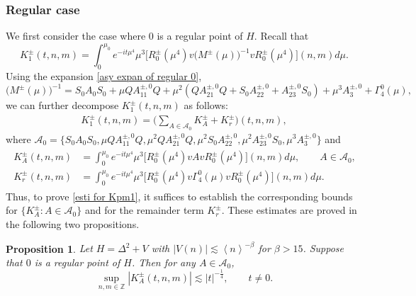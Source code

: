 \documentclass[reqno, 11pt]{amsart}
\newtheorem{proposition}[definition]{Proposition}
\newcommand\Z{\mathbb{Z}}
\newcommand\mcaA{\mathcal{A}}
\numberwithin{equation}{section}
\begin{document}
\subsubsection{{\bf {Regular case}}}
We first consider the case where $0$ is a regular point of $H$. Recall that
\begin{equation}\label{kernel of Kpm1}
K^{\pm}_{1}(t,n,m)=\int_{0}^{\mu_0}e^{-it\mu^4}\mu^3\big[R^{\pm}_0(\mu^4)v\big(M^{\pm}(\mu)\big)^{-1}vR^{\pm}_0(\mu^4)\big](n,m)d\mu.
\end{equation}
Using the expansion \eqref{asy expan of regular 0},
\begin{equation*}
\big(M^{\pm}(\mu)\big)^{-1}=S_0A_{0}S_0+\mu QA^{\pm,0}_{11}Q+\mu^2(QA^{\pm,0}_{21}Q+S_0A^{\pm,0}_{22}+A^{\pm,0}_{23}S_0)+\mu^3A^{\pm,0}_3+\Gamma^{0}_{4}(\mu),
\end{equation*}
we can further decompose $K^{\pm}_{1}(t,n,m)$ as follows:
\begin{align}\label{new expr of K1 regular 0}
K^{\pm}_1(t,n,m)=\Big(\sum\limits_{A\in\mcaA_0}K^{\pm}_A+K^{\pm}_r\Big)(t,n,m),
\end{align}
where $\mcaA_0=\{S_0A_{0}S_0,\mu QA^{\pm,0}_{11}Q,\mu^2QA^{\pm,0}_{21}Q,\mu^2S_0A^{\pm,0}_{22},\mu^2A^{\pm,0}_{23}S_0,\mu^3A^{\pm,0}_3\}$ and
\begin{align}\label{set A0 and kernel in regular case}
\begin{split}
K^{\pm}_A(t,n,m)&=\int_{0}^{\mu_0}e^{-it\mu^4}\mu^3\big[R^{\pm}_0(\mu^4)vAvR^{\pm}_0(\mu^4)\big](n,m)d\mu,\qquad A\in\mcaA_0,\\
K^{\pm}_r(t,n,m)&=\int_{0}^{\mu_0}e^{-it\mu^4}\mu^3\big[R^{\pm}_0(\mu^4)v\Gamma^0_{4}(\mu)vR^{\pm}_0(\mu^4)\big](n,m)d\mu.
\end{split}
\end{align}
Thus, to prove \eqref{esti for Kpm1}, it suffices to establish the corresponding bounds for $\{K^{\pm}_{A}:A\in\mcaA_0\}$ and for the remainder term $K^{\pm}_{r}$. These estimates are proved in the following two propositions.
\begin{proposition}\label{propo of K 01}
Let $H=\Delta^2+V$ with $|V(n)|\lesssim \left<n\right>^{-\beta}$ for $\beta>15$. Suppose that $0$ is a regular point of $H$. Then for any $A\in\mcaA_0$,
\begin{equation}\label{estimate of KB regular 0}
\sup\limits_{n,m\in\Z}|K^{\pm}_A(t,n,m)|\lesssim |t|^{-\frac{1}{4}},\qquad t\neq0.
\end{equation}
\end{proposition}
\end{document}
